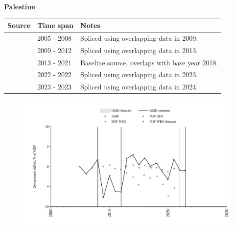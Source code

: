 \documentclass[12pt,a4paper,landscape]{article}
\begin{document}
\begin{adjustbox}{max totalsize={\paperwidth}{\paperheight},center}
\begin{minipage}[t][\textheight][t]{\textwidth}
\vspace*{0.5cm}
{}
\begin{center}
{\Large\bfseries Palestine}
\end{center}
\vspace{0.5cm}
\begin{table}[H]
\centering
\small
\begin{tabular}{|l|l|l|}
\hline
\textbf{Source} & \textbf{Time span} & \textbf{Notes} \\
\hline
\rowcolor{white}\cite{IMF_GFS}& 2005 - 2008 &Spliced using overlapping data in 2009.\\
\rowcolor{lightgray}\cite{IMF_WEO}& 2009 - 2012 &Spliced using overlapping data in 2013.\\
\rowcolor{white}\cite{AMF}& 2013 - 2021 &Baseline source, overlaps with base year 2018.\\
\rowcolor{lightgray}\cite{IMF_WEO}& 2022 - 2022 &Spliced using overlapping data in 2023.\\
\rowcolor{white}\cite{IMF_WEO_forecast}& 2023 - 2023 &Spliced using overlapping data in 2024.\\
\hline
\end{tabular}
\end{table}
\begin{figure}[H]
\centering
\includegraphics[width=\textwidth,height=0.6\textheight,keepaspectratio]{graphs/PSE_govdef_GDP.pdf}
\end{figure}
\end{minipage}
\end{adjustbox}
\end{document}
